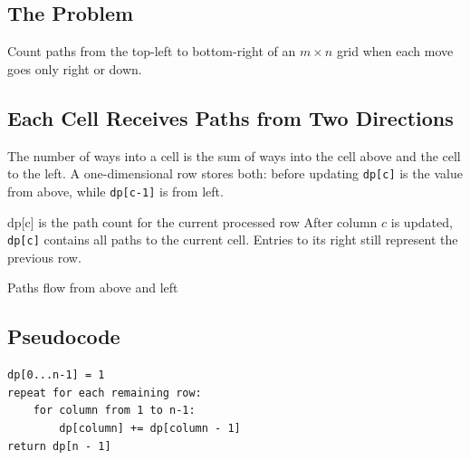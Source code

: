 

\subsection{The Problem}
Count paths from the top-left to bottom-right of an \(m\times n\) grid when
each move goes only right or down.

\subsection{Each Cell Receives Paths from Two Directions}
The number of ways into a cell is the sum of ways into the cell above and the
cell to the left. A one-dimensional row stores both: before updating
\texttt{dp[c]} is the value from above, while \texttt{dp[c-1]} is from left.

\begin{invariantbox}{dp[c] is the path count for the current processed row}
After column \(c\) is updated, \texttt{dp[c]} contains all paths to the current
cell. Entries to its right still represent the previous row.
\end{invariantbox}

\begin{visualbox}{Paths flow from above and left}
\centering
{}
\end{visualbox}

\subsection{Pseudocode}
\begin{lstlisting}[style=pseudocode]
dp[0...n-1] = 1
repeat for each remaining row:
    for column from 1 to n-1:
        dp[column] += dp[column - 1]
return dp[n - 1]
\end{lstlisting}


